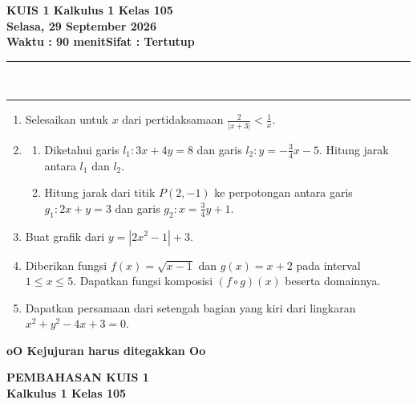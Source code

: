 \documentclass[11pt,a4paper]{article}
\begin{document}
\thispagestyle{empty}

\begin{center}
  \textbf{\Large KUIS 1 Kalkulus 1 Kelas 105}\\[0.6cm]
  \textbf{\large Selasa, 29 September 2026}\\[3pt]
  \textbf{\large Waktu : 90 menit\qquad Sifat : Tertutup}\\[3pt]
  \rule{11cm}{0.8pt}\\[-8pt]
  \rule{11cm}{0.4pt}
\end{center}
\vspace{0.4cm}

\begin{enumerate}
  \item Selesaikan untuk $x$ dari pertidaksamaan
    $\displaystyle\frac{2}{|x+3|}<\frac1x$.

  \item
    \begin{enumerate}
      \item Diketahui garis $l_1:3x+4y=8$ dan garis
        $l_2:y=-\frac34x-5$. Hitung jarak antara $l_1$ dan $l_2$.
      \item Hitung jarak dari titik $P(2,-1)$ ke perpotongan antara garis
        $g_1:2x+y=3$ dan garis $g_2:x=\frac34y+1$.
    \end{enumerate}

  \item Buat grafik dari $y=|2x^2-1|+3$.

  \item Diberikan fungsi $f(x)=\sqrt{x-1}$ dan $g(x)=x+2$ pada interval
    $1\le x\le5$. Dapatkan fungsi komposisi $(f\circ g)(x)$ beserta domainnya.

  \item Dapatkan persamaan dari setengah bagian yang kiri dari lingkaran
    $x^2+y^2-4x+3=0$.
\end{enumerate}

\vspace{1cm}
\begin{center}
  \textbf{\large oO Kejujuran harus ditegakkan Oo}
\end{center}

\newpage
\begin{center}
  \textbf{\Large PEMBAHASAN KUIS 1}\\[3pt]
  \textbf{Kalkulus 1 Kelas 105}
\end{center}
\end{document}
